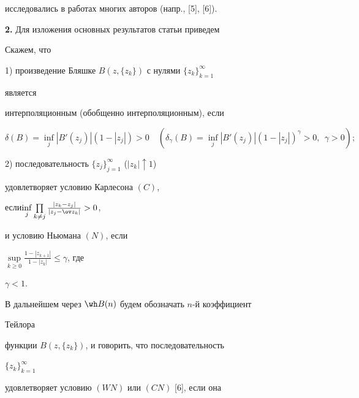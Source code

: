 исследовались в работах многих авторов (напр., [5], [6]). 


\medskip 


 


{\bf 2.} Для изложения основных результатов статьи приведем 


 


\begin{defnnonum} 


Скажем, что 


 


1) произведение Бляшке $B(z,\{z_k\})$ с нулями $\{z_k\}^\infty_{k=1}$ 


является 


интерполяционным (обобщенно интерполяционным), если 


$$ 


\delta(B)=\inf_j |B'(z_j)|(1-|z_j|)>0\quad 


(\delta_\gamma(B)=\inf_j |B'(z_j)|(1-|z_j|)^\gamma>0, 


\ \ \gamma>0); 


$$ 


 


2) последовательность $\{z_j\}^\infty_{j=1}$ ($|z_k|\uparrow1$) 


удовлетворяет условию Карлесона $(C)$, 


если\linebreak $\inf\limits_j\prod\limits_{k\ne j} \frac{|z_k-z_j|}{|z_j-\ov 


z_k|}>0$, 


и условию Ньюмана $(N)$, если 


$\sup\limits_{k\ge0}\frac{1-|z_{k+1}|}{1-|z_k|}\le\gamma$, где 


$\gamma<1$. 


\end{defnnonum} 


 


В дальнейшем через $\wh B(n)$ будем обозначать $n$-й коэффициент 


Тейлора 


функции $B(z,\{z_k\})$, и говорить, что последовательность 


$\{z_k\}^\infty_{k=1}$ 


удовлетворяет условию $(W N)$ или $(C N)$ [6], если она 


